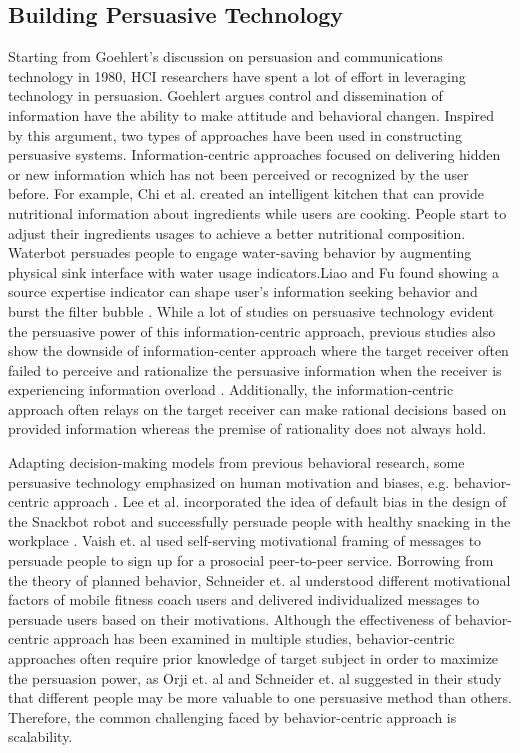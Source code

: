 \subsection{Building Persuasive Technology}
Starting from Goehlert's discussion on persuasion and communications technology in 1980, HCI researchers have spent a lot of effort in leveraging technology in persuasion\cite{goehlert1980information}. Goehlert argues control and dissemination of information have the ability to make attitude and behavioral changen\cite{goehlert1980information}. Inspired by this argument, two types of approaches have been used in constructing persuasive systems. Information-centric approaches focused on delivering hidden or new information which has not been perceived or recognized by the user before\cite{LeeKF11}. For example, Chi et al. created an intelligent kitchen that can provide nutritional information about ingredients while users are cooking\cite{chi2007enabling}. People start to adjust their ingredients usages to achieve a better nutritional composition. Waterbot persuades people to engage water-saving behavior by augmenting physical sink interface with water usage indicators\cite{arroyo2005waterbot}.Liao and Fu found showing a source expertise indicator can shape user's information seeking behavior and burst the filter bubble \cite{liao2014expert}. While a lot of studies on persuasive technology evident the persuasive power of this information-centric approach, previous studies also show the downside of information-center approach where the target receiver often failed to perceive and rationalize the persuasive information when the receiver is experiencing information overload \cite{goehlert1980information,LeeKF11}. Additionally, the information-centric approach often relays on the target receiver can make rational decisions based on provided information whereas the premise of rationality does not always hold.\par
Adapting decision-making models from previous behavioral research, some persuasive technology emphasized on human motivation and biases, e.g. behavior-centric approach \cite{LeeKF11}. Lee et al. incorporated the idea of default bias in the design of the Snackbot robot and successfully persuade people with healthy snacking in the workplace \cite{LeeKF11}. Vaish et. al used self-serving motivational framing of messages to persuade people to sign up for a prosocial peer-to-peer service\cite{vaish2018s}. Borrowing from the theory of planned behavior, Schneider et. al understood different motivational factors of mobile fitness coach users and delivered individualized messages to persuade users based on their motivations\cite{schneider2016understanding}. Although the effectiveness of behavior-centric approach has been examined in multiple studies, behavior-centric approaches often require prior knowledge of target subject in order to maximize the persuasion power, as Orji et. al and Schneider et. al suggested in their study that different people may be more valuable to one persuasive method than others\cite{schneider2016understanding,orji2014developing}. Therefore, the common challenging faced by behavior-centric approach is scalability.\par
